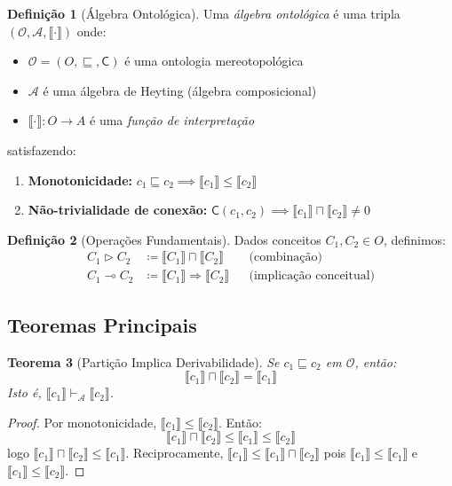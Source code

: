 \documentclass[12pt,a4paper]{article}
\theoremstyle{definition}
\newtheorem{definicao}{Definição}[section]
\theoremstyle{plain}
\newtheorem{teorema}[definicao]{Teorema}
\theoremstyle{remark}
\newcommand{\sem}[1]{\llbracket #1 \rrbracket}
\newcommand{\defeq}{\coloneqq}
\begin{document}
\begin{definicao}[Álgebra Ontológica]
Uma \emph{álgebra ontológica} é uma tripla $(\mathcal{O}, \mathcal{A}, \sem{\cdot})$ onde:
\begin{itemize}
  \item $\mathcal{O} = (O, \sqsubseteq, \mathsf{C})$ é uma ontologia mereotopológica
  \item $\mathcal{A}$ é uma álgebra de Heyting (álgebra composicional)
  \item $\sem{\cdot} : O \to A$ é uma \emph{função de interpretação}
\end{itemize}
satisfazendo:
\begin{enumerate}
  \item \textbf{Monotonicidade:} $c_1 \sqsubseteq c_2 \implies \sem{c_1} \leq \sem{c_2}$
  \item \textbf{Não-trivialidade de conexão:} $\mathsf{C}(c_1, c_2) \implies \sem{c_1} \sqcap \sem{c_2} \neq 0$
\end{enumerate}
\end{definicao}

\begin{definicao}[Operações Fundamentais]
Dados conceitos $C_1, C_2 \in O$, definimos:
\begin{align*}
  C_1 \triangleright C_2 &\defeq \sem{C_1} \sqcap \sem{C_2} && \text{(combinação)} \\
  C_1 \multimap C_2 &\defeq \sem{C_1} \Rightarrow \sem{C_2} && \text{(implicação conceitual)}
\end{align*}
\end{definicao}

\subsection{Teoremas Principais}

\begin{teorema}[Partição Implica Derivabilidade]
Se $c_1 \sqsubseteq c_2$ em $\mathcal{O}$, então:
$$
\sem{c_1} \sqcap \sem{c_2} = \sem{c_1}
$$
Isto é, $\sem{c_1} \vdash_{\mathcal{A}} \sem{c_2}$.
\end{teorema}

\begin{proof}
Por monotonicidade, $\sem{c_1} \leq \sem{c_2}$. Então:
$$
\sem{c_1} \sqcap \sem{c_2} \leq \sem{c_1} \leq \sem{c_2}
$$
logo $\sem{c_1} \sqcap \sem{c_2} \leq \sem{c_1}$. Reciprocamente, $\sem{c_1} \leq \sem{c_1} \sqcap \sem{c_2}$ pois $\sem{c_1} \leq \sem{c_1}$ e $\sem{c_1} \leq \sem{c_2}$.
\end{proof}
\end{document}
